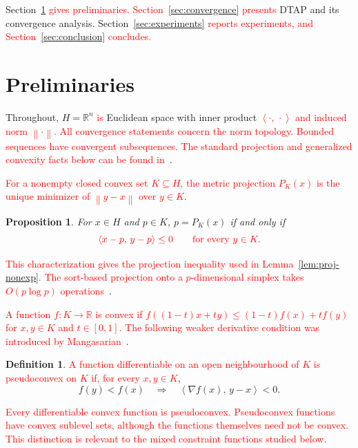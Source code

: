 \documentclass[]{interact}
\theoremstyle{plain}
\newtheorem{proposition}[theorem]{Proposition}
\theoremstyle{definition}
\newtheorem{definition}[theorem]{Definition}
\theoremstyle{remark}
\newcommand{\R}{\mathbb{R}}
\newcommand{\norm}[1]{\left\lVert #1 \right\rVert}
\newcommand{\inner}[2]{\left\langle #1,\, #2 \right\rangle}
\newcommand{\dtap}{\textsc{DTAP}}
\begin{document}
Section~\leavevmode\textcolor{red}{\ref{sec:prelim} gives preliminaries. Section~\ref{sec:convergence} presents} \dtap{} and its convergence analysis. Section~\leavevmode\textcolor{red}{\ref{sec:experiments} reports experiments, and Section~\ref{sec:conclusion} concludes.}


\section{Preliminaries}\label{sec:prelim}
Throughout, $H=\R^n$ \leavevmode\textcolor{red}{is} Euclidean space with inner product \leavevmode\textcolor{red}{$\inner{\cdot}{\cdot}$ and induced norm $\norm{\cdot}$. All convergence statements concern the norm topology. Bounded sequences have convergent subsequences. The standard projection and generalized convexity facts below can be found in~\citep{bauschke2011,mangasarian1994}}.

\leavevmode\textcolor{red}{For a nonempty closed convex set $K\subseteq H$, the metric projection $P_K(x)$ is the unique minimizer of $\norm{y-x}$ over $y\in K$}.
\begin{proposition}\label{prop:proj-char}
For $x\in H$ and $p\in K$, $p=P_K(x)$ if and only if
\begin{equation}\label{eq:proj-char}\textcolor{red}{
\inner{x-p}{y-p}\le0\qquad\text{for every }y\in K.
}\end{equation}
\end{proposition}
\leavevmode\textcolor{red}{This characterization gives the projection inequality used in Lemma~\ref{lem:proj-nonexp}. The sort-based projection onto a $p$-dimensional simplex takes $O(p\log p)$ operations~\citep{condat2016simplex}}.

\leavevmode\textcolor{red}{A function $f:K\to\R$ is convex if
$f((1-t)x+ty)\le(1-t)f(x)+tf(y)$ for $x,y\in K$ and $t\in[0,1]$.
The following weaker derivative condition was introduced by Mangasarian~\citep{mangasarian1965}}.
\begin{definition}\label{def:pseudoconvex}
\leavevmode\textcolor{red}{A function differentiable on an open neighbourhood of $K$ is pseudoconvex on $K$ if, for every $x,y\in K$},
\begin{equation}\label{eq:contrapositive}
f(y)<f(x)\quad\Longrightarrow\quad\inner{\nabla f(x)}{y-x}<0.
\end{equation}
\end{definition}
\leavevmode\textcolor{red}{Every differentiable convex function is pseudoconvex. Pseudoconvex functions have convex sublevel sets, although the functions themselves need not be convex. This distinction is relevant to the mixed constraint functions studied below.}
\end{document}
